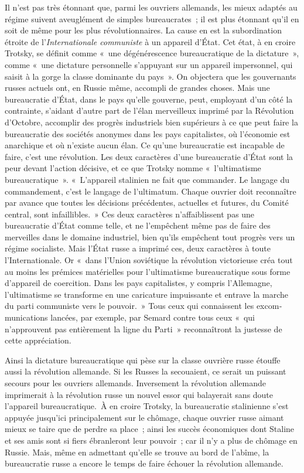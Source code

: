 \documentclass[french,twoside]{book} %
\begin{document}
Il n'est pas très étonnant que, parmi les ouvriers allemands, les mieux adaptés au régime suivent aveuglément de simples bureaucrates ; il est plus étonnant qu'il en soit de même pour les plus révolutionnaires. La cause en est la subordination étroite de l'{\itshape Internationale communiste} à un appareil d'État. Cet état, à en croire Trotsky, se définit comme « une dégénérescence bureau­cratique de la dictature », comme « une dictature personnelle s'appuyant sur un appareil impersonnel, qui saisit à la gorge la classe dominante du pays ». On objectera que les gouvernants russes actuels ont, en Russie même, accompli de grandes choses. Mais une bureaucratie d'État, dans le pays qu'elle gouverne, peut, employant d'un côté la contrainte, s'aidant d'autre part de l'élan merveilleux imprimé par la Révolution d'Octobre, accomplir des progrès industriels bien supérieurs à ce que peut faire la bureaucratie des sociétés anonymes dans les pays capitalistes, où l'économie est anarchique et où n'existe aucun élan. Ce qu'une bureaucratie est incapable de faire, c'est une révolution. Les deux caractères d'une bureaucratie d'État sont la peur devant l'action décisive, et ce que Trotsky nomme « l'ultimatisme bureaucratique ». « L'appareil stalinien ne fait que commander. Le langage du commandement, c'est le langage de l'ultimatum. Chaque ouvrier doit reconnaître par avance que toutes les décisions précédentes, actuelles et futures, du Comité central, sont infaillibles. » Ces deux caractères n'affaiblissent pas une bureaucratie d'État comme telle, et ne l'empêchent même pas de faire des merveilles dans le domaine industriel, bien qu'ils empêchent tout progrès vers un régime socialiste. Mais l'État russe a imprimé ces, deux caractères à toute l'Interna­tionale. Or « dans l'Union soviétique la révolution victorieuse créa tout au moins les prémices matérielles pour l'ultimatisme bureaucratique sous forme d'appareil de coercition. Dans les pays capitalistes, y compris l'Allemagne, l'ultimatisme se transforme en une caricature impuissante et entrave la marche du parti communiste vers le pouvoir. » Tous ceux qui connaissent les excom­munications lancées, par exemple, par Semard contre tous ceux « qui n'approuvent pas entièrement la ligne du Parti » reconnaîtront la justesse de cette appréciation.\par
Ainsi la dictature bureaucratique qui pèse sur la classe ouvrière russe étouffe aussi la révolution allemande. Si les Russes la secouaient, ce serait un puissant secours pour les ouvriers allemands. Inversement la révolution allemande imprimerait à la révolution russe un nouvel essor qui balayerait sans doute l'appareil bureaucratique. À en croire Trotsky, la bureaucratie stali­nienne s'est appuyée jusqu'ici principalement sur le chômage, chaque ouvrier russe aimant mieux se taire que de perdre sa place ; ainsi les succès écono­miques dont Staline et ses amis sont si fiers ébranleront leur pouvoir ; car il n'y a plus de chômage en Russie. Mais, même en admettant qu'elle se trouve au bord de l'abîme, la bureaucratie russe a encore le temps de faire échouer la révolution allemande.\par
\end{document}
